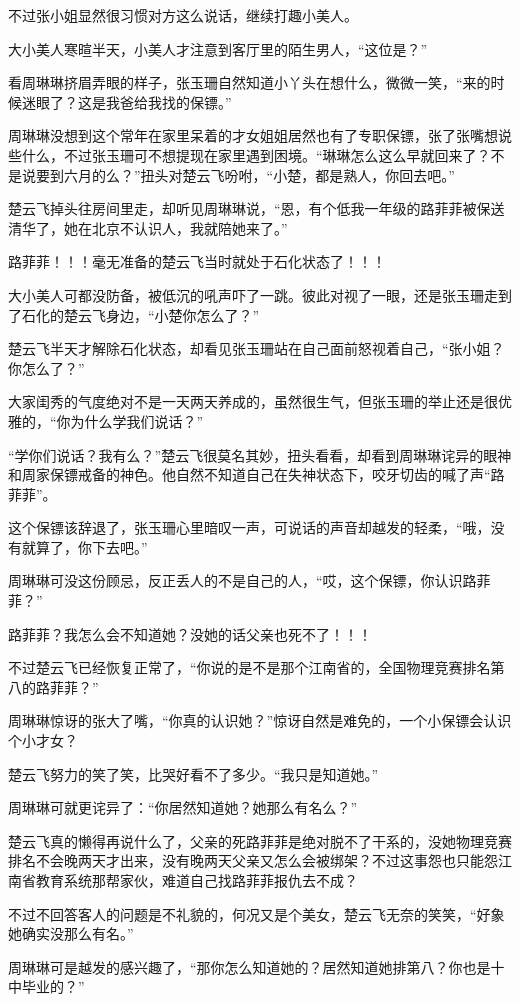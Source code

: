 不过张小姐显然很习惯对方这么说话，继续打趣小美人。

大小美人寒暄半天，小美人才注意到客厅里的陌生男人，“这位是？”

看周琳琳挤眉弄眼的样子，张玉珊自然知道小丫头在想什么，微微一笑，“来的时候迷眼了？这是我爸给我找的保镖。”

周琳琳没想到这个常年在家里呆着的才女姐姐居然也有了专职保镖，张了张嘴想说些什么，不过张玉珊可不想提现在家里遇到困境。“琳琳怎么这么早就回来了？不是说要到六月的么？”扭头对楚云飞吩咐，“小楚，都是熟人，你回去吧。”

楚云飞掉头往房间里走，却听见周琳琳说，“恩，有个低我一年级的路菲菲被保送清华了，她在北京不认识人，我就陪她来了。”

路菲菲！！！毫无准备的楚云飞当时就处于石化状态了！！！

大小美人可都没防备，被低沉的吼声吓了一跳。彼此对视了一眼，还是张玉珊走到了石化的楚云飞身边，“小楚你怎么了？”

楚云飞半天才解除石化状态，却看见张玉珊站在自己面前怒视着自己，“张小姐？你怎么了？”

大家闺秀的气度绝对不是一天两天养成的，虽然很生气，但张玉珊的举止还是很优雅的，“你为什么学我们说话？”

“学你们说话？我有么？”楚云飞很莫名其妙，扭头看看，却看到周琳琳诧异的眼神和周家保镖戒备的神色。他自然不知道自己在失神状态下，咬牙切齿的喊了声“路菲菲”。

这个保镖该辞退了，张玉珊心里暗叹一声，可说话的声音却越发的轻柔，“哦，没有就算了，你下去吧。”

周琳琳可没这份顾忌，反正丢人的不是自己的人，“哎，这个保镖，你认识路菲菲？”

路菲菲？我怎么会不知道她？没她的话父亲也死不了！！！

不过楚云飞已经恢复正常了，“你说的是不是那个江南省的，全国物理竞赛排名第八的路菲菲？”

周琳琳惊讶的张大了嘴，“你真的认识她？”惊讶自然是难免的，一个小保镖会认识个小才女？

楚云飞努力的笑了笑，比哭好看不了多少。“我只是知道她。”

周琳琳可就更诧异了：“你居然知道她？她那么有名么？”

楚云飞真的懒得再说什么了，父亲的死路菲菲是绝对脱不了干系的，没她物理竞赛排名不会晚两天才出来，没有晚两天父亲又怎么会被绑架？不过这事怨也只能怨江南省教育系统那帮家伙，难道自己找路菲菲报仇去不成？

不过不回答客人的问题是不礼貌的，何况又是个美女，楚云飞无奈的笑笑，“好象她确实没那么有名。”

周琳琳可是越发的感兴趣了，“那你怎么知道她的？居然知道她排第八？你也是十中毕业的？”

